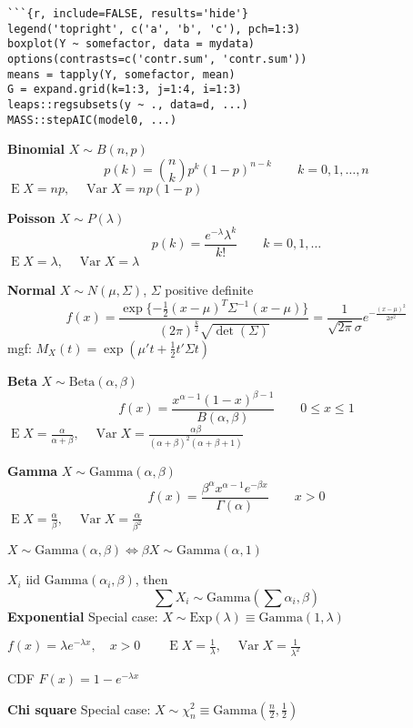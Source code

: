 \documentclass[10pt, twocolumn]{article}
\newcommand{\iid}{\text{ iid }}
\newcommand{\Expect}{\operatorname{E}}
\newcommand{\Var}{\operatorname{Var}}
\begin{document}
\newpage

\begin{verbatim}
```{r, include=FALSE, results='hide'}
legend('topright', c('a', 'b', 'c'), pch=1:3)
boxplot(Y ~ somefactor, data = mydata)
options(contrasts=c('contr.sum', 'contr.sum'))
means = tapply(Y, somefactor, mean)
G = expand.grid(k=1:3, j=1:4, i=1:3)
leaps::regsubsets(y ~ ., data=d, ...)
MASS::stepAIC(model0, ...)
\end{verbatim}

\textbf{Binomial}
$X \sim B(n, p)$
\[
    p(k) = \binom{n}{k} p^k (1-p)^{n-k}
    \qquad k = 0, 1, \dots, n
\]
$\Expect X = np, \quad \Var X = np(1-p)$

\textbf{Poisson}
$X \sim P(\lambda)$
\[
    p(k) = \frac{e^{-\lambda} \lambda^k}{k!}
    \qquad k = 0, 1, \dots
\]
$\Expect X = \lambda, \quad \Var X = \lambda$

\textbf{Normal}
$X \sim N(\mu, \Sigma)$, $\Sigma$ positive definite
\[
    f(x) = \frac{\exp\{ - \frac{1}{2}(x - \mu)^T \Sigma^{-1} (x - \mu) \}}
        {(2\pi)^{\frac{k}{2}} \sqrt{\det(\Sigma)}}
        = \frac{1}{\sqrt{2 \pi} \sigma} e^{-\frac{(x - \mu)^2}{2
        \sigma^2}}
\]
mgf: $M_X (t) = \exp (\mu' t + \frac{1}{2} t' \Sigma t)$

\textbf{Beta}
$ X \sim \text{Beta}(\alpha, \beta)$
\[
    f(x) = \frac{x^{\alpha-1}(1 - x)^{\beta-1}}{B(\alpha, \beta)} 
    \qquad 0 \leq x \leq 1
\]
$\Expect X = \frac{\alpha}{\alpha + \beta},
\quad \Var X = \frac{\alpha \beta}{(\alpha + \beta)^2 (\alpha + \beta + 1)}$

\textbf{Gamma}
$X \sim \text{Gamma}(\alpha, \beta)$
\[
    f(x) = \frac{\beta^\alpha x^{\alpha-1} e^{-\beta x}}{\Gamma(\alpha)}
    \qquad x > 0
\]
$\Expect X = \frac{\alpha}{\beta},
\quad \Var X = \frac{\alpha}{\beta^2}$

$X \sim \text{Gamma}(\alpha, \beta) \iff \beta X \sim \text{Gamma}(\alpha, 1)$

$X_i \iid \text{Gamma}(\alpha_i, \beta)$, then
\[
    \sum X_i \sim \text{Gamma}(\sum \alpha_i, \beta)
\]
\textbf{Exponential}
Special case: $X \sim \text{Exp}(\lambda) \equiv \text{Gamma}(1, \lambda)$

$
f(x) = \lambda e^{-\lambda x},
\quad x > 0
\qquad \Expect X = \frac{1}{\lambda},
\quad \Var X = \frac{1}{\lambda ^2}
$

CDF $F(x) = 1 - e^{-\lambda x}$

\textbf{Chi square}
Special case: $X \sim \chi^2_n \equiv \text{Gamma}(\frac{n}{2}, \frac{1}{2})$
\end{document}
